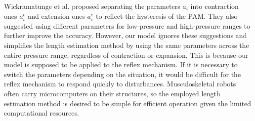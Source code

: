 Wickramatunge et al. proposed separating the parameters $a_i$ into contraction ones $a^c_i$ and extension ones $a^e_i$ to reflect the hysteresis of the PAM\cite{spring}. They also suggested using different parameters for low-pressure and high-pressure ranges to further improve the accuracy\cite{spring}. However, our model ignores these suggestions and simplifies the length estimation method by using the same parameters across the entire pressure range, regardless of contraction or expansion. This is because our model is supposed to be applied to the reflex mechanism. If it is necessary to switch the parameters depending on the situation, it would be difficult for the reflex mechanism to respond quickly to disturbances.
Musculoskeletal robots often carry microcomputers on their structures, so the employed length estimation method is desired to be simple for efficient operation given the limited computational resources.



 



